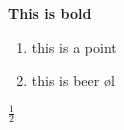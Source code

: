 \documentclass[a4paper]{report}
\begin{document}
\textbf{This is bold}
\begin{enumerate}
	\item this is a point
	\item this is beer \o l
\end{enumerate}
$\frac{1}{2}$
\end{document}
